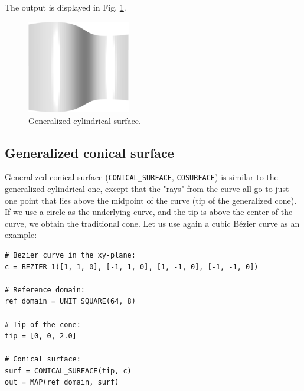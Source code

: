 \noindent
The output is displayed in Fig. \ref{fig:curves-11}.\\

\begin{figure}[!ht]
\begin{center}
\includegraphics[width=0.4\textwidth]{img/curves-11.png}
\end{center}
\vspace{-4mm}
\caption{Generalized cylindrical surface.}
\label{fig:curves-11}
\end{figure}


\subsection{Generalized conical surface}

Generalized conical surface ({\tt CONICAL\_SURFACE}, {\tt COSURFACE}) 
is similar to the generalized cylindrical 
one, except that the "rays" from the curve all go to just one
point that lies above the midpoint of the curve (tip of the generalized cone). 
If we use a circle as the underlying curve, and the tip is above the center of the curve, 
we obtain the traditional cone. Let us use again a cubic B\'ezier curve
as an example:\\

\begin{bbox}
\begin{verbatim}
# Bezier curve in the xy-plane:
c = BEZIER_1([1, 1, 0], [-1, 1, 0], [1, -1, 0], [-1, -1, 0])

# Reference domain:
ref_domain = UNIT_SQUARE(64, 8)

# Tip of the cone:
tip = [0, 0, 2.0]

# Conical surface:
surf = CONICAL_SURFACE(tip, c)
out = MAP(ref_domain, surf)
\end{verbatim}
\end{bbox}
\vspace{6mm}

